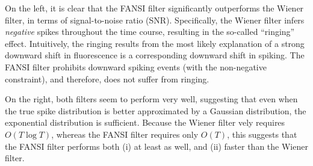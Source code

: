 On the left, it is clear that the FANSI filter significantly outperforms the Wiener filter, in terms of signal-to-noise ratio (SNR).  Specifically, the Wiener filter infers \emph{negative} spikes throughout the time course, resulting in the so-called ``ringing'' effect.  Intuitively, the ringing results from the most likely explanation of a strong downward shift in fluorescence is a corresponding downward shift in spiking.  The FANSI filter prohibits downward spiking events (with the non-negative constraint), and therefore, does not suffer from ringing.  

On the right, both filters seem to perform very well, suggesting that even when the true spike distribution is better approximated by a Gaussian distribution, the exponential distribution is sufficient.  Because the Wiener filter \nai vely requires $O(T \log T)$, whereas the FANSI filter requires only $O(T)$, this suggests that the FANSI filter performs both (i) at least as well, and (ii) faster than the Wiener filter.  

